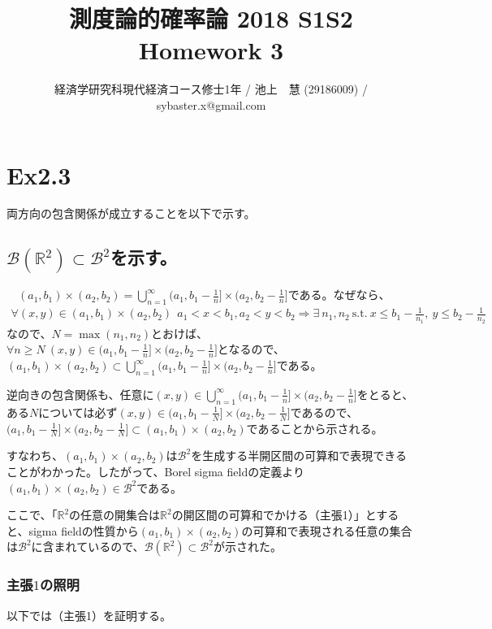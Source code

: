 \documentclass{article}
\begin{document}
\title{測度論的確率論 2018 S1S2 \\ 
Homework 3}
\author{経済学研究科現代経済コース修士1年 / 池上　慧 (29186009) / sybaster.x@gmail.com}
\maketitle

\section{Ex2.3}
両方向の包含関係が成立することを以下で示す。

\subsection{$\mathcal{B}\left( \mathbb{R}^2 \right) \subset \mathcal{B}^2$を示す。}
　$(a_1, b_1)\times (a_2,b_2) = \bigcup_{n=1}^{\infty} (a_1, b_1 -\frac{1}{n}] \times(a_2, b_2-\frac{1}{n}]$である。なぜなら、
\begin{align*}
	\forall (x, y) \in (a_1, b_1)\times (a_2,b_2)\ \ a_1 < x < b_1, a_2 < y<b_2
	\Rightarrow
	\exists\ n_1,n_2\ \text{s.t.}\ x\leq b_1-\frac{1}{n_1},\ y\leq b_2-\frac{1}{n_2}
\end{align*}
なので、$N = \max(n_1, n_2)$とおけば、$\forall n\geq N\ (x,y) \in (a_1, b_1 -\frac{1}{n}] \times(a_2, b_2-\frac{1}{n}]$となるので、$(a_1, b_1)\times (a_2,b_2) \subset \bigcup_{n=1}^{\infty} (a_1, b_1 -\frac{1}{n}] \times(a_2, b_2-\frac{1}{n}]$である。

逆向きの包含関係も、任意に$(x,y)\in \bigcup_{n=1}^{\infty} (a_1, b_1 -\frac{1}{n}] \times(a_2, b_2-\frac{1}{n}]$をとると、ある$N$については必ず$(x, y)\in (a_1, b_1 -\frac{1}{N}] \times(a_2, b_2-\frac{1}{N}]$であるので、$(a_1, b_1 -\frac{1}{N}] \times(a_2, b_2-\frac{1}{N}] \subset (a_1,b_1)\times(a_2,b_2)$であることから示される。

すなわち、$(a_1,b_1)\times(a_2,b_2)$は$\mathcal{B}^2$を生成する半開区間の可算和で表現できることがわかった。したがって、Borel sigma fieldの定義より$(a_1,b_1)\times(a_2,b_2) \in \mathcal{B}^2$である。

ここで、「$\mathbb{R}^2$の任意の開集合は$\mathbb{R}^2$の開区間の可算和でかける（主張1）」とすると、sigma fieldの性質から$(a_1,b_1)\times(a_2,b_2)$の可算和で表現される任意の集合は$\mathcal{B}^2$に含まれているので、$\mathcal{B}\left( \mathbb{R}^2 \right) \subset \mathcal{B}^2$が示された。

\subsubsection{主張$1$の照明}
以下では（主張1）を証明する。
\end{document}
